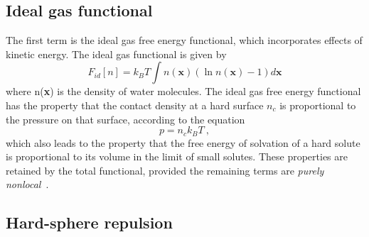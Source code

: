 \documentclass[letterpaper,twocolumn,amsmath,amssymb,prb]{revtex4-1}
\newcommand{\xx}{\textbf{x}}
\begin{document}
\subsection{Ideal gas functional}
The first term is the ideal gas free energy functional,
which incorporates effects of kinetic energy.  The ideal gas
functional is given by
\begin{equation}\label{idealgas}
  F_{id}[n] = k_B T \int n(\xx)\left( \ln{n(\xx)} - 1\right) d\xx
\end{equation}
where n(\xx) is the density of water molecules.  The ideal gas free
energy functional has the property that the contact density at a hard
surface $n_c$ is proportional to the pressure on that surface,
according to the equation
\begin{equation}
  p = n_c k_BT \:,
\end{equation}
which also leads to the property that the free energy of solvation of
a hard solute is proportional to its volume in the limit of small
solutes.  These properties are retained by the total functional,
provided the remaining terms are \emph{purely
  nonlocal}~\cite{ashcroft?}.

\subsection{Hard-sphere repulsion}
\end{document}
